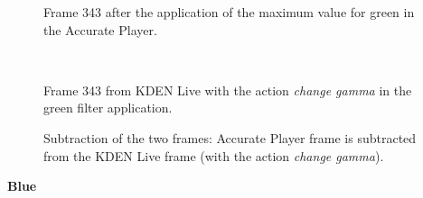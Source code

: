 \documentclass[../MasterThesis.tex]{subfiles}
\begin{document}
\begin{minipage}{0.48\textwidth}
	\begin{figure}[H]
		\begin{center}
			\caption[]{\small Frame 343 after the application of the maximum value for green in the Accurate Player.}
		\end{center}
	\end{figure}
\end{minipage}\begin{minipage}{0.04\textwidth}
	\ 
\end{minipage}\begin{minipage}{0.48\textwidth}
	\begin{figure}[H]
		\begin{center}
			\caption[]{\small Frame 343 from KDEN Live with the action \textit{change gamma} in the green filter application.}
		\end{center}
	\end{figure}
\end{minipage}

\vspace*{-1em}

\begin{figure}[H]
	\begin{center}
		\caption[]{\small Subtraction of the two frames: Accurate Player frame is subtracted from the KDEN Live frame (with the action \textit{change gamma}).}
	\end{center}
\end{figure}







\vspace*{-1em}

\textbf{Blue}

\vspace*{-1em}
\end{document}

